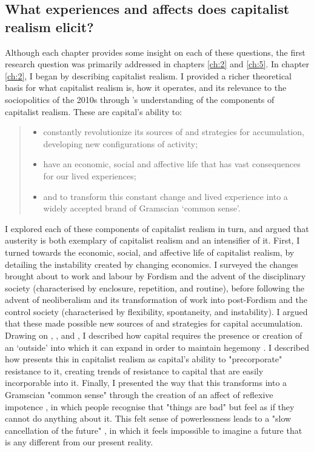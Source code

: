 \subsection{What experiences and affects does capitalist realism elicit?}
\label{subsec:9-2-1}
Although each chapter provides some insight on each of these questions, the first research question was primarily addressed in chapters \ref{ch:2} and \ref{ch:5}. In chapter \ref{ch:2}, I began by describing capitalist realism. I provided a richer theoretical basis for what capitalist realism is, how it operates, and its relevance to the sociopolitics of the 2010s through \citet[p. 6]{shonkwiler_reading_2014}’s understanding of the components of capitalist realism. These are capital’s ability to:
\begin{quote}
\begin{itemize}
\item  constantly revolutionize its sources of and strategies for accumulation, developing new configurations of activity;
\item have an economic, social and affective life that has vast consequences for our lived experiences;
\item and to transform this constant change and lived experience into a widely accepted brand of Gramscian `common sense'.
\end{itemize}
\end{quote}
I explored each of these components of capitalist realism in turn, and argued that austerity is both exemplary of capitalist realism and an intensifier of it. First, I turned towards the economic, social, and affective life of capitalist realism, by detailing the instability created by changing economics. I surveyed the changes brought about to work and labour by Fordism and the advent of the disciplinary society (characterised by enclosure, repetition, and routine), before following the advent of neoliberalism and its transformation of work into post-Fordism and the control society (characterised by flexibility, spontaneity, and instability). I argued that these made possible new sources of and strategies for capital accumulation. Drawing on \citet{marx_capital_1889}, \citet{luxemburg_accumulation_2015}, and \citet{harvey_new_2003}, I described how capital requires the presence or creation of an `outside' into which it can expand in order to maintain hegemony \citep{gramsci_selections_2007}. I described how \citet{fisher_capitalist_2009} presents this in capitalist realism as capital's ability to "precorporate" resistance to it, creating trends of resistance to capital that are easily incorporable into it. Finally, I presented the way that this transforms into a Gramscian "common sense" through the creation of an affect of reflexive impotence \citep[p. 24]{fisher_capitalist_2009}, in which people recognise that "things are bad" but feel as if they cannot do anything about it. This felt sense of powerlessness leads to a "slow cancellation of the future" \citep[p. 5]{fisher_ghosts_2014}, in which it feels impossible to imagine a future that is any different from our present reality.

